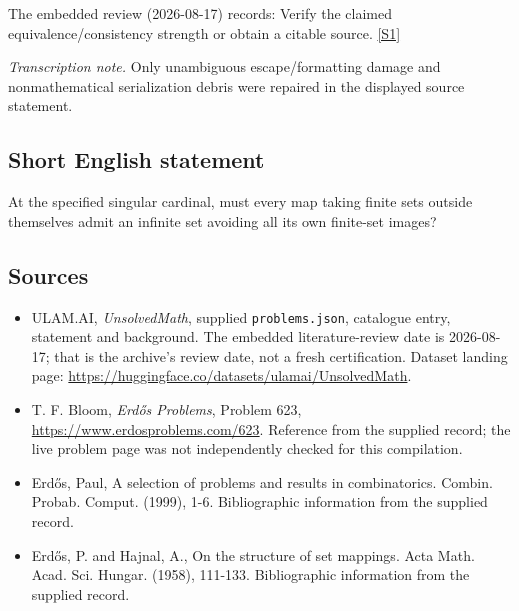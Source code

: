 \documentclass[11pt,a4paper]{article}
\newcommand{\sref}[2]{\hyperlink{source:#1:#2}{[S#2]}}
\begin{document}
The embedded review (2026-08-17) records: Verify the claimed equivalence/consistency strength or obtain a citable source. \sref{statement}{1}

{\small\emph{Transcription note.} Only unambiguous escape/formatting damage and nonmathematical serialization debris were repaired in the displayed source statement.}

\subsection{Short English statement}

At the specified singular cardinal, must every map taking finite sets outside themselves admit an infinite set avoiding all its own finite-set images?

\subsection{Sources}

{\small

\begin{itemize}

\item[\hypertarget{source:statement:1}{S1}] ULAM.AI, \emph{UnsolvedMath}, supplied \texttt{problems.json}, catalogue entry, statement and background. The embedded literature-review date is 2026-08-17; that is the archive’s review date, not a fresh certification. Dataset landing page: \url{https://huggingface.co/datasets/ulamai/UnsolvedMath}.

\item[\hypertarget{source:statement:2}{S2}] T. F. Bloom, \emph{Erdős Problems}, Problem 623, \url{https://www.erdosproblems.com/623}. Reference from the supplied record; the live problem page was not independently checked for this compilation.

\item[\hypertarget{source:statement:3}{S3}] Erd\H{o}s, Paul, A selection of problems and results in combinatorics. Combin. Probab. Comput. (1999), 1-6. Bibliographic information from the supplied record.

\item[\hypertarget{source:statement:4}{S4}] Erd\H{o}s, P. and Hajnal, A., On the structure of set mappings. Acta Math. Acad. Sci. Hungar. (1958), 111-133. Bibliographic information from the supplied record.

\end{itemize}

}

\label{end:statement}
\end{document}
